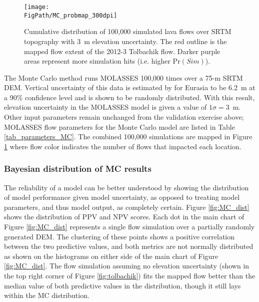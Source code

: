 		\begin{figure}
			\centering
			\texttt{[image: \\FigPath/MC\_probmap\_300dpi]}
			\caption[Map of Monte Carlo simulations of the 2012-3 Tolbachik lava flows]{Cumulative distribution of 100,000 simulated lava flows over SRTM topography with 3~m elevation uncertainty. The red outline is the mapped flow extent of the 2012-3 Tolbachik flow. Darker purple areas represent more simulation hits (i.e. higher $\text{Pr}(Sim)$).}
			\label{fig_MC_map}
		\end{figure}
		
		The Monte Carlo method runs MOLASSES 100,000 times over a 75-m SRTM DEM. Vertical uncertainty of this data is estimated by \citet{rodriguez2006global} for Eurasia to be 6.2~m at a 90\% confidence level and is shown to be randomly distributed. With this result, elevation uncertainty in the MOLASSES model is given a value of $1\sigma=3$~m. Other input parameters remain unchanged from the validation exercise above; MOLASSES flow parameters for the Monte Carlo model are listed in Table \ref{tab_parameters_MC}. The combined 100,000 simulations are mapped in Figure \ref{fig_MC_map} where flow color indicates the number of flows that impacted each location.
		

				
		\subsubsection{Bayesian distribution of MC results}
			The reliability of a model can be better understood by showing the distribution of model performance given model uncertainty, as opposed to treating model parameters, and thus model output, as completely certain.  Figure \ref{fig:MC_dist} shows the distribution of PPV and NPV scores. Each dot in the main chart of Figure \ref{fig:MC_dist} represents a single flow simulation over a partially randomly generated DEM. The clustering of these points shows a positive correlation between the two predictive values, and both metrics are not normally distributed as shown on the histograms on either side of the main chart of Figure \ref{fig:MC_dist}. The flow simulation assuming no elevation uncertainty (shown in the top right corner of Figure \ref{fig:tolbachik}) fits the mapped flow better than the median value of both predictive values in the distribution, though it still lays within the MC distribution.
			
